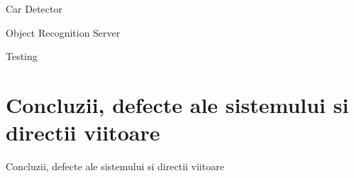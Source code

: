 \documentclass{beamer}
\begin{document}
    \begin{frame}{Car Detector}
        
    \end{frame}

    \begin{frame}{Object Recognition Server}
        
    \end{frame}

    \begin{frame}{Testing}
        
    \end{frame}

\section{Concluzii, defecte ale sistemului si directii viitoare}
    \begin{frame}{Concluzii, defecte ale sistemului si directii viitoare}

    \end{frame}
\end{document}
